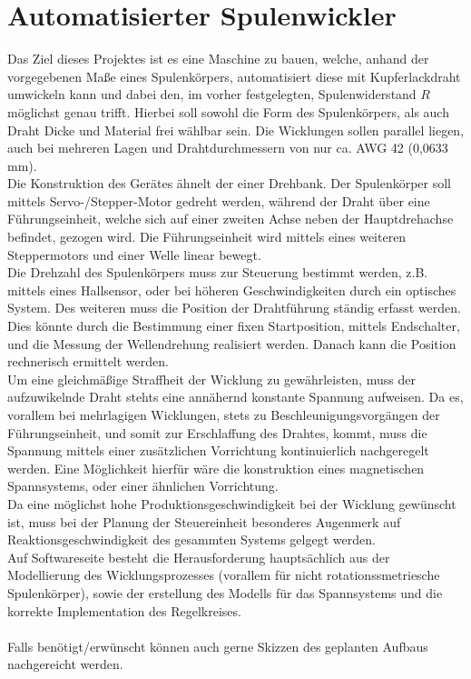 \section{Automatisierter Spulenwickler}

Das Ziel dieses Projektes ist es eine Maschine zu bauen,  welche, anhand der vorgegebenen Maße eines Spulenkörpers, automatisiert diese mit Kupferlackdraht umwickeln kann und dabei den, im vorher festgelegten, Spulenwiderstand $R$ möglichst genau trifft. Hierbei soll sowohl die Form des Spulenkörpers, als auch Draht Dicke und Material frei wählbar sein. Die Wicklungen sollen parallel liegen, auch bei mehreren Lagen und Drahtdurchmessern von nur ca. AWG 42 (0,0633 mm).\\
Die Konstruktion des Gerätes ähnelt der einer Drehbank. Der Spulenkörper soll mittels Servo-/Stepper-Motor gedreht werden, während der Draht über eine Führungseinheit, welche sich auf einer zweiten Achse neben der Hauptdrehachse befindet, gezogen wird. Die Führungseinheit wird mittels eines weiteren Steppermotors und einer Welle linear bewegt.\\
Die Drehzahl des Spulenkörpers muss zur Steuerung bestimmt werden, z.B. mittels eines Hallsensor, oder bei höheren Geschwindigkeiten durch ein optisches System. Des weiteren muss die Position der Drahtführung ständig erfasst werden. Dies könnte durch die Bestimmung einer fixen Startposition, mittels Endschalter, und die Messung der Wellendrehung realisiert werden. Danach kann die Position rechnerisch ermittelt werden. 
\\ 
Um eine gleichmäßige Straffheit der Wicklung zu gewährleisten, muss der aufzuwikelnde Draht stehts eine annähernd konstante Spannung aufweisen. Da es, vorallem bei mehrlagigen Wicklungen, stets zu Beschleunigungsvorgängen der Führungseinheit, und somit zur Erschlaffung des Drahtes, kommt, muss die Spannung mittels einer zusätzlichen Vorrichtung kontinuierlich nachgeregelt werden. Eine Möglichkeit hierfür wäre die konstruktion eines magnetischen Spannsystems, oder einer ähnlichen Vorrichtung.\\
Da eine möglichst hohe Produktionsgeschwindigkeit bei der Wicklung gewünscht ist, muss bei der Planung der Steuereinheit besonderes Augenmerk auf Reaktionsgeschwindigkeit des gesammten Systems gelgegt werden.\\
Auf Softwareseite besteht die Herausforderung hauptsächlich aus der Modellierung des Wicklungsprozesses (vorallem für nicht rotationssmetriesche Spulenkörper), sowie der erstellung des Modells für das Spannsystems und die korrekte Implementation des Regelkreises.\\ 
\\

Falls benötigt/erwünscht können auch gerne Skizzen des geplanten Aufbaus nachgereicht werden.